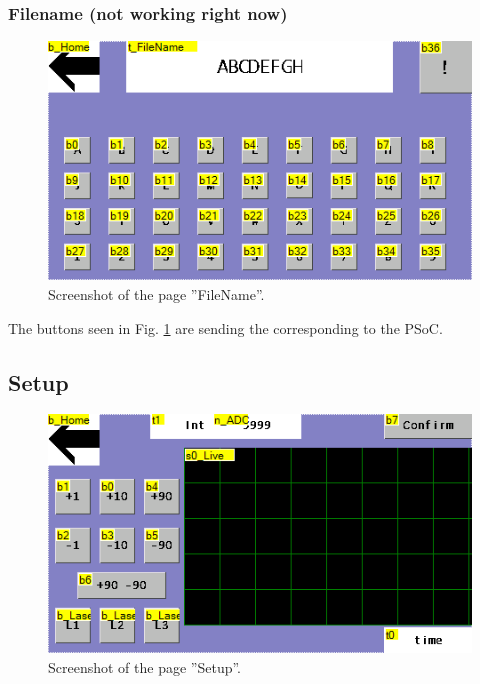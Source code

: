 	\subsubsection{Filename (not working right now)}
	
	\begin{figure}[h]
		\centering
		\includegraphics[width=0.7\linewidth]{LamellaDevice_Hardware/FileNamePage}
		\caption{Screenshot of the page ''FileName''.}
		\label{fig:filename}
	\end{figure}


	The buttons seen in Fig. \ref{fig:filename} are sending the corresponding  to the PSoC. 

	
	\subsection{Setup}
	
	\begin{figure}[h]
		\centering
		\includegraphics[width=0.7\linewidth]{LamellaDevice_Hardware/SetupPage}
		\caption{Screenshot of the page ''Setup''.}
		\label{fig:setuppage}
	\end{figure}
	
